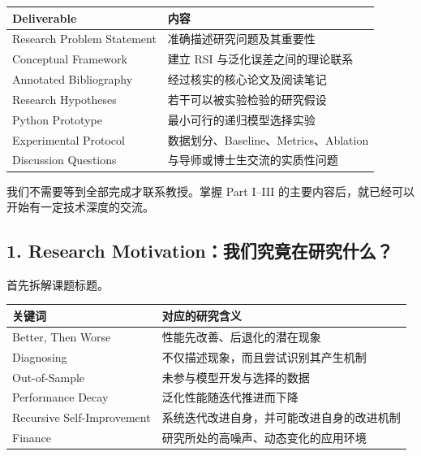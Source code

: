 \begin{readertable}
\begin{longtable}[]{@{}
  >{\raggedright\arraybackslash}p{}
  >{\raggedright\arraybackslash}p{}@{}}
\toprule
Deliverable & 内容 \\
\midrule
\endhead
Research Problem Statement & 准确描述研究问题及其重要性 \\
Conceptual Framework & 建立 RSI 与泛化误差之间的理论联系 \\
Annotated Bibliography & 经过核实的核心论文及阅读笔记 \\
Research Hypotheses & 若干可以被实验检验的研究假设 \\
Python Prototype & 最小可行的递归模型选择实验 \\
Experimental Protocol & 数据划分、Baseline、Metrics、Ablation \\
Discussion Questions & 与导师或博士生交流的实质性问题 \\
\bottomrule
\end{longtable}
\end{readertable}

我们不需要等到全部完成才联系教授。掌握 Part I--III 的主要内容后，就已经可以开始有一定技术深度的交流。

\hypertarget{part-1-03-0001-research-motivationux6211ux4eecux7a76ux7adfux5728ux7814ux7a76ux4ec0ux4e48}{%
\subsection{1. Research Motivation：我们究竟在研究什么？}\label{part-1-03-0001-research-motivationux6211ux4eecux7a76ux7adfux5728ux7814ux7a76ux4ec0ux4e48}}

首先拆解课题标题。

\begin{readertable}
\begin{longtable}[]{@{}
  >{\raggedright\arraybackslash}p{}
  >{\raggedright\arraybackslash}p{}@{}}
\toprule
关键词 & 对应的研究含义 \\
\midrule
\endhead
Better, Then Worse & 性能先改善、后退化的潜在现象 \\
Diagnosing & 不仅描述现象，而且尝试识别其产生机制 \\
Out-of-Sample & 未参与模型开发与选择的数据 \\
Performance Decay & 泛化性能随迭代推进而下降 \\
Recursive Self-Improvement & 系统迭代改进自身，并可能改进自身的改进机制 \\
Finance & 研究所处的高噪声、动态变化的应用环境 \\
\bottomrule
\end{longtable}
\end{readertable}

